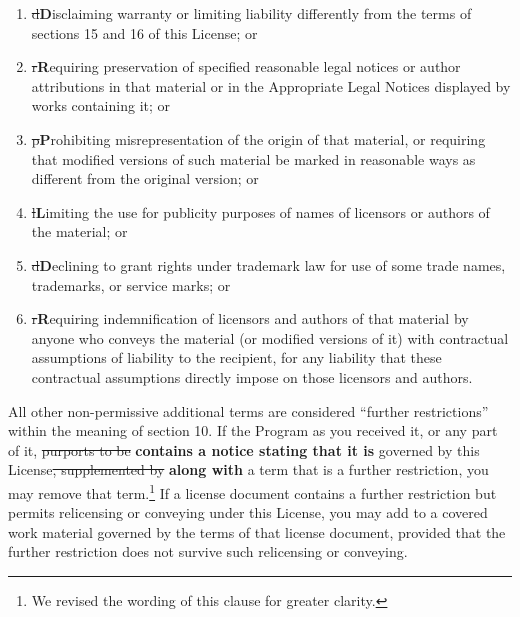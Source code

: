 \documentclass[11pt]{article}
\newcounter{v2section}
\newcounter{v3section}
\begin{document}
\renewcommand{\labelenumi}{\alph{enumi}\sout{.}\textbf{)}}
\begin{enumerate}

\item

  \sout{d}\textbf{D}isclaiming warranty or limiting liability
     differently from the
  terms of sections 15 and 16 of this License; or

\item 

  \sout{r}\textbf{R}equiring preservation of specified reasonable legal
  notices or author attributions in that material or in the Appropriate
  Legal Notices displayed by works containing it; or
 
\item 

  \sout{p}\textbf{P}rohibiting misrepresentation of the origin of that
  material, or requiring that modified versions of such material be
  marked in reasonable ways as different from the original version; or

\item 

  \sout{l}\textbf{L}imiting the use for publicity purposes of names of
  licensors or authors of the material; or

\item

  \sout{d}\textbf{D}eclining to grant rights under trademark law for use
  of some trade names, trademarks, or service marks; or

\item

  \sout{r}\textbf{R}equiring indemnification of licensors and authors of
  that material by anyone who conveys the material (or modified versions
  of it) with contractual assumptions of liability to the recipient, for
  any liability that these contractual assumptions directly impose on
  those licensors and authors.

\end{enumerate}

  All other non-permissive additional terms are considered ``further
restrictions'' within the meaning of section 10.  If the Program as you
received it, or any part of it, \sout{purports to be} \textbf{contains a
notice stating that it is} governed by this License\sout{, supplemented
by} \textbf{along with} a term that is a further restriction, you may
remove that term.\footnote{We revised the wording of this clause for
greater clarity.}  If a license document contains a further restriction
but permits relicensing or conveying under this License, you may add to
a covered work material governed by the terms of that license document,
provided that the further restriction does not survive such relicensing
or conveying.
\end{document}

